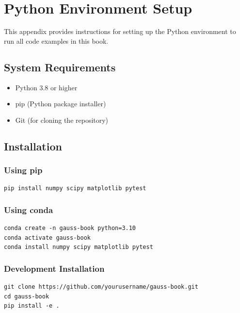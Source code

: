 \chapter{Python Environment Setup}

This appendix provides instructions for setting up the Python environment to run all code examples in this book.

\section{System Requirements}

\begin{itemize}
    \item Python 3.8 or higher
    \item pip (Python package installer)
    \item Git (for cloning the repository)
\end{itemize}

\section{Installation}

\subsection{Using pip}

\begin{lstlisting}[style=bash, caption={Installing required packages}]
pip install numpy scipy matplotlib pytest
\end{lstlisting}

\subsection{Using conda}

\begin{lstlisting}[style=bash, caption={Installing with conda}]
conda create -n gauss-book python=3.10
conda activate gauss-book
conda install numpy scipy matplotlib pytest
\end{lstlisting}

\subsection{Development Installation}

\begin{lstlisting}[style=bash, caption={Installing in development mode}]
git clone https://github.com/yourusername/gauss-book.git
cd gauss-book
pip install -e .
\end{lstlisting}

